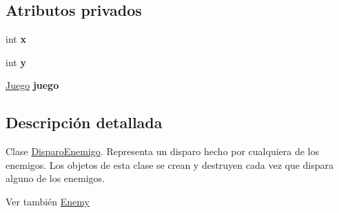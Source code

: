\subsection*{Atributos privados}
\begin{DoxyCompactItemize}
\item 
\hypertarget{classBatallaEspacial_1_1DisparoEnemigo_a01941f1a77568e12cf9fa142fcfd2aab}{
int {\bfseries x}}
\label{classBatallaEspacial_1_1DisparoEnemigo_a01941f1a77568e12cf9fa142fcfd2aab}

\item 
\hypertarget{classBatallaEspacial_1_1DisparoEnemigo_ab22087ca658f35d680c86bd25ad18328}{
int {\bfseries y}}
\label{classBatallaEspacial_1_1DisparoEnemigo_ab22087ca658f35d680c86bd25ad18328}

\item 
\hypertarget{classBatallaEspacial_1_1DisparoEnemigo_aad347800753c7c5fbd4a447b102d90de}{
\hyperlink{classBatallaEspacial_1_1Juego}{Juego} {\bfseries juego}}
\label{classBatallaEspacial_1_1DisparoEnemigo_aad347800753c7c5fbd4a447b102d90de}

\end{DoxyCompactItemize}


\subsection{Descripción detallada}
Clase \hyperlink{classBatallaEspacial_1_1DisparoEnemigo}{DisparoEnemigo}. Representa un disparo hecho por cualquiera de los enemigos. Los objetos de esta clase se crean y destruyen cada vez que dispara alguno de los enemigos. \begin{DoxySeeAlso}{Ver también}
\hyperlink{classBatallaEspacial_1_1Enemy}{Enemy} 
\end{DoxySeeAlso}


